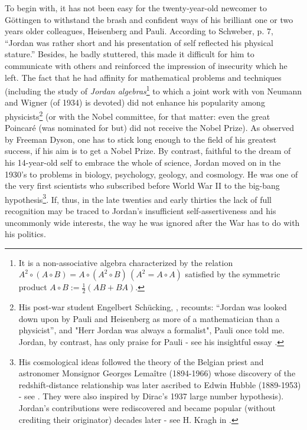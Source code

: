 \documentclass[12pt]{article}
\begin{document}
To begin with, it has not been easy for the twenty-year-old newcomer to G\"ottingen to withstand
the brash and confident ways of his brilliant one or two years older colleagues, Heisenberg and Pauli.
According to Schweber, \cite{Sch} p. 7, ``Jordan was rather short and his presentation of self
reflected his physical stature.'' Besides, he badly stuttered, this made it difficult for him to
communicate with others and reinforced the impression of insecurity which he left. The fact that he
had affinity for mathematical problems and techniques (including the study of {\it Jordan algebras}\footnote{It is a non-associative 
algebra characterized by the relation $A^2\circ(A\circ B) = A\circ(A^2\circ B) \, (A^2 = A\circ A)$ satisfied by the symmetric 
product $A\circ B := \frac{1}{2}(A B + B A)$.} to which a joint work with von Neumann and Wigner \cite{JNW} (of 1934) is devoted) 
did not enhance his popularity among physicists\footnote{His post-war student Engelbert Sch\"ucking, \cite{Sch99}, 
recounts: ``Jordan was looked down upon  by Pauli and Heisenberg as more of a mathematician than 
a physicist'', and "Herr Jordan was always a formalist", Pauli once told me. Jordan, by contrast,
has only praise for Pauli - see his insightful essay \cite{J}.} (or with the Nobel committee, for 
that matter: even the great Poincar\'e (was nominated for but) did not receive the Nobel Prize). 
As observed by Freeman Dyson, one has to stick long enough to the field of his greatest success, 
if his aim is to get a Nobel Prize. By contrast, faithful to the dream of his 14-year-old self
to embrace the whole of science, Jordan moved on in the 1930's to problems in biology,
psychology, geology, and cosmology. He was one of the very first scientists who subscribed
before World War II to the big-bang hypothesis\footnote{His cosmological ideas followed the theory of
the Belgian priest and astronomer Monsignor Georges Lema\^itre (1894-1966) whose discovery of the redshift-distance
relationship was later ascribed to Edwin Hubble (1889-1953) - see \cite{WN}. They were also inspired by Dirac's 1937
large number hypothesis). Jordan's contributions were rediscovered and became popular (without crediting their
originator) decades later - see H. Kragh in \cite{PJ07}.}. If, thus, in the late twenties and early
thirties the lack of full recognition may be traced to Jordan's insufficient self-assertiveness and
his uncommonly wide interests, the way he was ignored after the War has to do with his politics.
\end{document}
